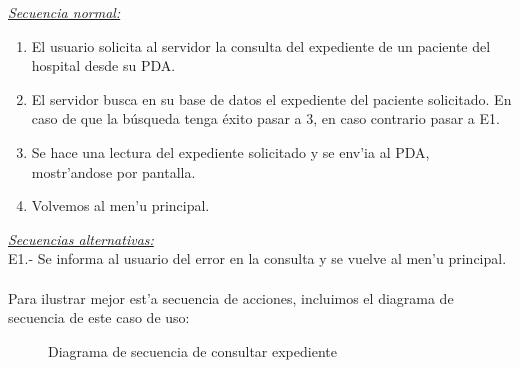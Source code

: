 \emph{\underline{Secuencia normal:}}
\begin{enumerate}
	\item El usuario solicita al servidor la consulta del expediente de un paciente del hospital desde su PDA.
	\item El servidor busca en su base de datos el expediente del paciente solicitado. En caso de que la b\'usqueda tenga \'exito pasar a 3, en caso contrario pasar a E1.
	\item Se hace una lectura del expediente solicitado y se env'ia al PDA, mostr'andose por pantalla.
	\item Volvemos al men'u principal.
\end{enumerate}

\emph{\underline{Secuencias alternativas:}}\\

E1.- Se informa al usuario del error en la consulta y se vuelve al men'u principal.\\
\\


Para ilustrar mejor est'a secuencia de acciones, incluimos el diagrama de secuencia de este caso de uso:\\

\begin{figure}[h!]
	\begin{center}
     	\end{center}
    	\caption{Diagrama de secuencia de consultar expediente}\label{fig:consulta_expediente}
\end{figure}